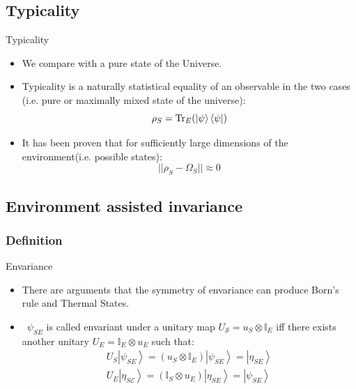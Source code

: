 \documentclass[handout]{beamer}
\begin{document}
\subsection{Typicality}
\begin{frame}{Typicality}
\begin{itemize}
\item We compare with a pure state of the Universe.
\item Typicality is a naturally statistical equality of an observable in the two cases (i.e. pure or maximally mixed state of the universe):
\begin{equation}
\rho_{S}= \operatorname{Tr}_{E}(\ket{\psi}\bra{\psi})
\end{equation}
\item It has been proven that for sufficiently large 
dimensions of the environment(i.e. possible states):
\begin{equation}
||\rho_S-\Omega_S||\approx 0
\end{equation}

\end{itemize}

\end{frame}
\subsection{Environment assisted invariance}
\subsubsection{Definition}
\begin{frame}{Envariance}
\begin{itemize}
\item There are arguments that the symmetry of envariance can produce Born's rule and Thermal States.
\item \ $\psi_{SE}$ is called envariant under a unitary map $U_{\mathcal{S}}=u_{S} \otimes \mathbb{I}_{E}$ iff there exists another unitary $U_{E}= \mathbb{I}_{E} \otimes u_{E} $ such that:
\begin{equation}
\begin{array}{l}
U_{S}\left|\psi_{S E}\right\rangle=\left(u_{S} \otimes \mathbb{I}_{E}\right)\left|\psi_{S E}\right\rangle=\left|\eta_{S E}\right\rangle \\
U_{E}\left|\eta_{S \mathcal{E}}\right\rangle=\left(\mathbb{I}_{S} \otimes u_{E}\right)\left|\eta_{S E}\right\rangle=\left|\psi_{S E}\right\rangle
\end{array}
\end{equation}
\end{itemize}
\end{frame}
\end{document}
